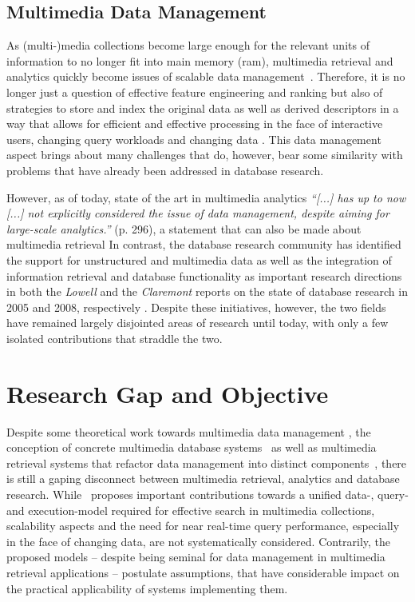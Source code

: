 \subsection{Multimedia Data Management}

As (multi-)media collections become large enough for the relevant units of information to no longer fit into main memory (\acrshort{ram}), multimedia retrieval and analytics quickly become issues of scalable data management~\cite{Jonsson:2016Ten,Pouyanfar:2018}. Therefore, it is no longer just a question of effective feature engineering and ranking but also of strategies to store and index the original data as well as derived descriptors in a way that allows for efficient and effective processing in the face of interactive users, changing query workloads and changing data \cite{Smeulders:2000Content}. This data management aspect brings about many challenges that do, however, bear some similarity with problems that have already been addressed in database research.

However, as of today, state of the art in multimedia analytics \emph{``[...] has up to now [...] not explicitly considered the issue of data management, despite aiming for large-scale analytics.''} \cite{Jonsson:2016Ten} (p. 296), a statement that can also be made about multimedia retrieval In contrast, the database research community has identified the support for unstructured and multimedia data as well as the integration of information retrieval and database functionality as important research directions in both the \emph{Lowell} and the \emph{Claremont} reports on the state of database research in 2005 and 2008, respectively \cite{Abiteboul:2005Lowell,Agrawal:2008Claremont}. Despite these initiatives, however, the two fields have remained largely disjointed areas of research until today, with only a few isolated contributions that straddle the two.

\section{Research Gap and Objective}
\label{section:research_gap}

Despite some theoretical work towards multimedia data management \cite{Marcus:1996Foundations,Adjeroh:1997Multimedia}, the conception of concrete multimedia database systems~\cite{Giangreco:2016Adam,Yang:2020Pase,Wang:2021Milvus} as well as multimedia retrieval systems that refactor data management into distinct components~\cite{Carey:1995Towards,Rossetto:2016Vitrivr,Gasser:2019Multimodal}, there is still a gaping disconnect between multimedia retrieval, analytics and database research. While~\cite{Giangreco:2018Database} proposes important contributions towards a unified data-, query- and execution-model required for effective search in multimedia collections, scalability aspects and the need for near real-time query performance, especially in the face of changing data, are not systematically considered. Contrarily, the proposed models -- despite being seminal for data management in multimedia retrieval applications -- postulate assumptions, that have considerable impact on the practical applicability of systems implementing them.

